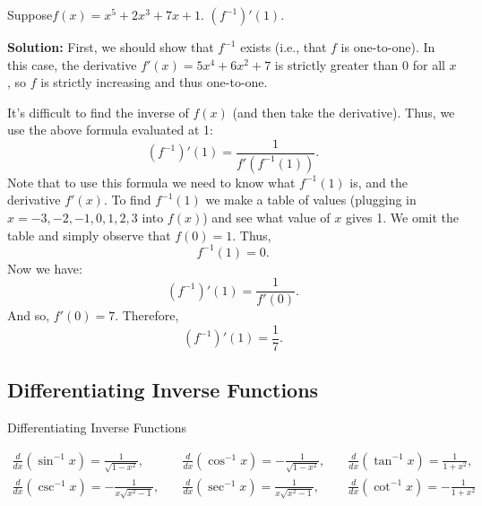 \documentclass[12pt]{article}
\theoremstyle{beautifulthm}
\begin{document}
\begin{tcolorbox}[colback=examplebg, colframe=red!75!black, title=\textbf{EXAMPLE 1: Find the Derivative of the function}, fonttitle=\bfseries, sharp corners]

Suppose\( f(x) = x^5 + 2x^3 + 7x + 1 \).  \( (f^{-1})'(1) \).

\tcblower
\textbf{Solution:}
First, we should show that \( f^{-1} \) exists (i.e., that \( f \) is one-to-one). In this case, the derivative \( f'(x) = 5x^4 + 6x^2 + 7 \) is strictly greater than 0 for all \( x \), so \( f \) is strictly increasing and thus one-to-one.

It's difficult to find the inverse of \( f(x) \) (and then take the derivative). Thus, we use the above formula evaluated at 1:
\[
(f^{-1})'(1) = \frac{1}{f'\left(f^{-1}(1)\right)}.
\]
Note that to use this formula we need to know what \( f^{-1}(1) \) is, and the derivative \( f'(x) \). To find \( f^{-1}(1) \) we make a table of values (plugging in \( x = -3, -2, -1, 0, 1, 2, 3 \) into \( f(x) \)) and see what value of \( x \) gives 1. We omit the table and simply observe that \( f(0) = 1 \). Thus,
\[
f^{-1}(1) = 0.
\]
Now we have:
\[
(f^{-1})'(1) = \frac{1}{f'(0)}.
\]
And so, \( f'(0) = 7 \). Therefore,
\[
(f^{-1})'(1) = \frac{1}{7}.
\]


\end{tcolorbox}






\newpage
\subsection{Differentiating Inverse Functions}

\begin{Note}{Differentiating Inverse Functions}{}

\[
\begin{array}{ccc}
\frac{d}{dx} (\sin^{-1} x) = \frac{1}{\sqrt{1 - x^2}}, & \quad \frac{d}{dx} (\cos^{-1} x) = -\frac{1}{\sqrt{1 - x^2}}, & \quad \frac{d}{dx} (\tan^{-1} x) = \frac{1}{1 + x^2}, \\
\frac{d}{dx} (\csc^{-1} x) = -\frac{1}{x\sqrt{x^2 - 1}}, & \quad \frac{d}{dx} (\sec^{-1} x) = \frac{1}{x\sqrt{x^2 - 1}}, & \quad \frac{d}{dx} (\cot^{-1} x) = -\frac{1}{1 + x^2}
\end{array}
\]

\end{Note}
\end{document}
